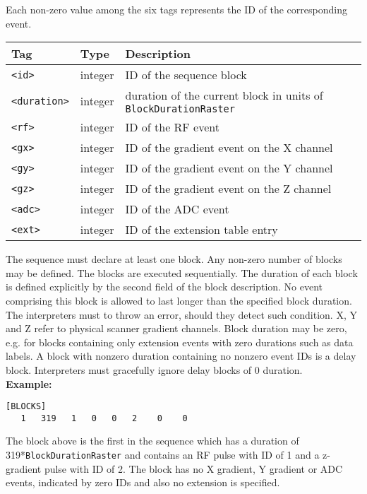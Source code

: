 \documentclass{article}
\begin{document}
Each non-zero value among the six tags represents the ID of the corresponding event.

\begin{tabularx}{\textwidth}{llX}
\toprule
Tag & Type & Description\\
\midrule
\verb.<id>. & integer & ID of the sequence block \\
\verb.<duration>. & integer & duration of the current block in units of \verb.BlockDurationRaster. \\
\verb.<rf>. & integer & ID of the RF event \\
\verb.<gx>. & integer & ID of the gradient event on the X channel \\
\verb.<gy>. & integer & ID of the gradient event on the Y channel \\
\verb.<gz>. & integer & ID of the gradient event on the Z channel \\
\verb.<adc>. & integer & ID of the ADC event \\
\verb.<ext>. & integer & ID of the extension table entry \\
\bottomrule
\end{tabularx}

\begin{minipage}{\textwidth}
The sequence must declare at least one block. Any non-zero number of blocks may be defined. The blocks are executed sequentially. The duration of each block is defined explicitly by the second field of the block description. No event comprising this block is allowed to last longer than the specified block duration. The interpreters must to throw an error, should they detect such condition. X, Y and Z refer to physical scanner gradient channels. Block duration may be zero, e.g. for blocks containing only extension events with zero durations such as data labels. A block with nonzero duration containing no nonzero event IDs is a delay block. Interpreters must gracefully ignore delay blocks of 0 duration. \\

\textbf{Example:}
\begin{lstlisting}
[BLOCKS]
   1   319   1   0   0   2    0    0
\end{lstlisting}
\end{minipage}

The block above is the first in the sequence which has a duration of 319*\verb.BlockDurationRaster. and contains an RF pulse with ID of 1 and a z-gradient pulse with ID of 2. The block has no X gradient, Y gradient or ADC events, indicated by zero IDs and also no extension is specified.
\end{document}
